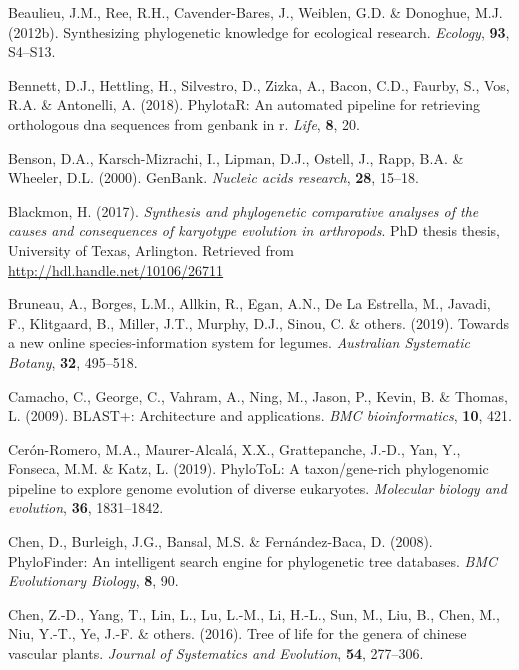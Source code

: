 \documentclass[]{article}
\begin{document}
\leavevmode\hypertarget{ref-beaulieu2012synthesizing}{}%
Beaulieu, J.M., Ree, R.H., Cavender-Bares, J., Weiblen, G.D. \& Donoghue, M.J. (2012b). Synthesizing phylogenetic knowledge for ecological research. \emph{Ecology}, \textbf{93}, S4--S13.

\leavevmode\hypertarget{ref-bennett2018phylotar}{}%
Bennett, D.J., Hettling, H., Silvestro, D., Zizka, A., Bacon, C.D., Faurby, S., Vos, R.A. \& Antonelli, A. (2018). PhylotaR: An automated pipeline for retrieving orthologous dna sequences from genbank in r. \emph{Life}, \textbf{8}, 20.

\leavevmode\hypertarget{ref-benson2000genbank}{}%
Benson, D.A., Karsch-Mizrachi, I., Lipman, D.J., Ostell, J., Rapp, B.A. \& Wheeler, D.L. (2000). GenBank. \emph{Nucleic acids research}, \textbf{28}, 15--18.

\leavevmode\hypertarget{ref-blackmon2017synthesis}{}%
Blackmon, H. (2017). \emph{Synthesis and phylogenetic comparative analyses of the causes and consequences of karyotype evolution in arthropods}. PhD thesis thesis, University of Texas, Arlington. Retrieved from \url{http://hdl.handle.net/10106/26711}

\leavevmode\hypertarget{ref-bruneau2019towards}{}%
Bruneau, A., Borges, L.M., Allkin, R., Egan, A.N., De La Estrella, M., Javadi, F., Klitgaard, B., Miller, J.T., Murphy, D.J., Sinou, C. \& others. (2019). Towards a new online species-information system for legumes. \emph{Australian Systematic Botany}, \textbf{32}, 495--518.

\leavevmode\hypertarget{ref-camacho2009blast}{}%
Camacho, C., George, C., Vahram, A., Ning, M., Jason, P., Kevin, B. \& Thomas, L. (2009). BLAST+: Architecture and applications. \emph{BMC bioinformatics}, \textbf{10}, 421.

\leavevmode\hypertarget{ref-ceron2019phylotol}{}%
Cerón-Romero, M.A., Maurer-Alcalá, X.X., Grattepanche, J.-D., Yan, Y., Fonseca, M.M. \& Katz, L. (2019). PhyloToL: A taxon/gene-rich phylogenomic pipeline to explore genome evolution of diverse eukaryotes. \emph{Molecular biology and evolution}, \textbf{36}, 1831--1842.

\leavevmode\hypertarget{ref-chen2008phylofinder}{}%
Chen, D., Burleigh, J.G., Bansal, M.S. \& Fernández-Baca, D. (2008). PhyloFinder: An intelligent search engine for phylogenetic tree databases. \emph{BMC Evolutionary Biology}, \textbf{8}, 90.

\leavevmode\hypertarget{ref-chen2016tree}{}%
Chen, Z.-D., Yang, T., Lin, L., Lu, L.-M., Li, H.-L., Sun, M., Liu, B., Chen, M., Niu, Y.-T., Ye, J.-F. \& others. (2016). Tree of life for the genera of chinese vascular plants. \emph{Journal of Systematics and Evolution}, \textbf{54}, 277--306.
\end{document}
